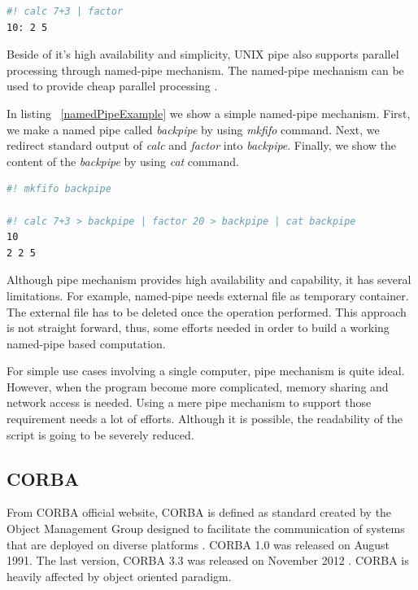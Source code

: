 \documentclass[conference]{IEEEtran}
\begin{document}
\begin{lstlisting}[caption=Unnamed pipe example, label=unnamedPipeExample, language=bash, basicstyle=\small, breaklines=true]
#! calc 7+3 | factor
10: 2 5
\end{lstlisting}

Beside of it's high availability and simplicity, UNIX pipe also supports parallel
processing through named-pipe mechanism. The named-pipe mechanism can be used to 
provide cheap parallel processing \cite{conway2003parallel}. 

In listing ~\ref{namedPipeExample} we show a simple named-pipe mechanism. First, we make
a named pipe called {\it backpipe} by using {\it mkfifo} command. Next, we redirect
standard output of {\it calc} and {\it factor} into {\it backpipe}. Finally, we show
the content of the {\it backpipe} by using {\it cat} command.

\begin{lstlisting}[caption=Named pipe example, label=namedPipeExample, language=bash, basicstyle=\small, breaklines=true]
#! mkfifo backpipe 

#! calc 7+3 > backpipe | factor 20 > backpipe | cat backpipe
10
2 2 5
\end{lstlisting}

Although pipe mechanism provides high availability and capability, 
it has several limitations. For example, named-pipe needs external file as temporary 
container. The external file has to be deleted once the operation performed. 
This approach is not straight forward, thus, some efforts needed in order to 
build a working named-pipe based computation. 

For simple use cases involving a single computer, pipe mechanism is quite ideal. 
However, when the program become more complicated, memory sharing  and network access 
is needed. Using a mere pipe mechanism to support those requirement needs a lot of 
efforts. Although it is possible, the readability of the script is going to be 
severely reduced.


\subsection{CORBA}

From CORBA official website, CORBA is defined as standard created by the Object 
Management Group designed to facilitate the communication of systems 
that are deployed on diverse platforms \cite{corba}. CORBA 1.0 was released on August 
1991. The last version, CORBA 3.3 was released on November 2012 \cite{corbaspec}.
CORBA is heavily affected by object oriented paradigm.
\end{document}
